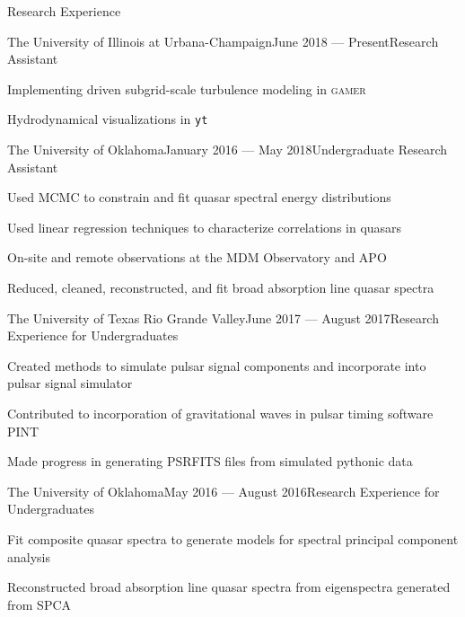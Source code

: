 \documentclass{resume} %
\begin{document}
\begin{rSection}{Research Experience}

\begin{rSubsection}{The University of Illinois at Urbana-Champaign}{June 2018 --- Present}{Research Assistant}{}
\item Implementing driven subgrid-scale turbulence modeling in \textsc{gamer}
\item Hydrodynamical visualizations in \texttt{yt}
\end{rSubsection}


\begin{rSubsection}{The University of Oklahoma}{January 2016 --- May 2018}{Undergraduate Research Assistant}{}
\item Used MCMC to constrain and fit quasar spectral energy distributions
\item Used linear regression techniques to characterize correlations in quasars
\item On-site and remote observations at the MDM Observatory and APO
\item Reduced, cleaned, reconstructed, and fit broad absorption line quasar spectra
\end{rSubsection}


\begin{rSubsection}{The University of Texas Rio Grande Valley}{June 2017 --- August 2017}{Research Experience for Undergraduates}{}
\item Created methods to simulate pulsar signal components and incorporate into pulsar signal simulator
\item Contributed to incorporation of gravitational waves in pulsar timing software PINT
\item Made progress in generating PSRFITS files from simulated pythonic data
\end{rSubsection}


\begin{rSubsection}{The University of Oklahoma}{May 2016 --- August 2016}{Research Experience for Undergraduates}{}
\item Fit composite quasar spectra to generate models for spectral principal component analysis
\item Reconstructed broad absorption line quasar spectra from eigenspectra generated from SPCA 
\end{rSubsection}

\end{rSection}
\end{document}
